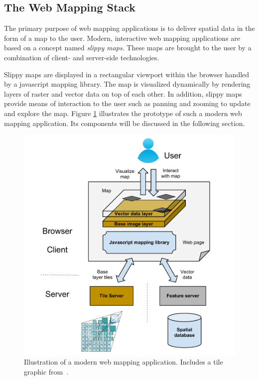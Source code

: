 \subsection{The Web Mapping Stack}

The primary purpose of web mapping applications is to deliver spatial data in the form of a map to the user. Modern, interactive web mapping applications are based on a concept named \textit{slippy maps}. These maps are brought to the user by a combination of client- and server-side technologies. 

Slippy maps are displayed in a rectangular viewport within the browser handled by a javascript mapping library. The map is visualized dynamically by rendering layers of raster and vector data on top of each other. In addition, slippy maps provide means of interaction to the user such as panning and zooming to update and explore the map. Figure \ref{fig:web-mapping-stack} illustrates the prototype of such a modern web mapping application. Its components will be discussed in the following section.

\begin{figure}[h]
  \begin{center}
    \includegraphics[width=1\textwidth]{figures/web_mapping_stack.pdf}
    \caption{Illustration of a modern web mapping application. Includes a tile graphic from~\cite{web:cubeservtiles}.}
    \label{fig:web-mapping-stack}
  \end{center}
\end{figure}


